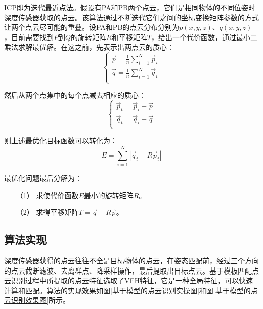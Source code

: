 \documentclass[fontset=fandol,type=bachelor,campus=harbin,bsmainpagenumberline=true]{hithesisbook}
\begin{document}
ICP即为迭代最近点法。假设有PA和PB两个点云，它们是相同物体的不同位姿时深度传感器获取的点云。该算法通过不断迭代它们之间的坐标变换矩阵参数的方式让两个点云尽可能的重叠\cite{chetverikov2002trimmed}。设PA和PB的点云分布分别为$p\left( x,y,z \right) $、$q\left( x,y,z \right) $，目前需要找到$P$到$Q$的旋转矩阵$R$和平移矩阵$T$，给出一个代价函数，通过最小二乘法求解最优解。在这之前，先表示出两点云的质心：
\begin{equation}
\left\{ \begin{array}{c}
	\vec{p}=\frac{1}{n}\sum_{i=1}^N{\vec{p}_i}\\
	\vec{q}=\frac{1}{n}\sum_{i=1}^N{\vec{q}_i}\\
\end{array} \right. 
\label{点云质心描述1} 
\end{equation}


然后从两个点集中的每个点减去相应的质心：
\begin{equation}
\left\{ \begin{array}{c}
	\vec{p}_t=\vec{p}_i-\vec{p}\\
	\vec{q}_t=\vec{q}_i-\vec{q}\\
\end{array} \right. 
\label{点云质心描述2} 
\end{equation}


则上述最优化目标函数可以转化为：
\begin{equation}
E=\sum_{i=1}^N{\left| \vec{q}_t-R\vec{p}_t \right|}
\label{ICP代价函数} 
\end{equation}


最优化问题最后分解为：
\begin{itemize}
\item[（1）]
求使代价函数$E$最小的旋转矩阵$R$。
\item[（2）]
求得平移矩阵$T=\vec{q}-R\vec{p}$。
\end{itemize}

\subsection{算法实现}
深度传感器获得的点云往往不全是目标物体的点云，在姿态匹配前，经过三个方向的点云截断滤波、去离群点、降采样操作，最后提取出目标点云。基于模板匹配点云识别过程中所提取的点云特征选取了VFH特征，它是一种全局特征，可以快速计算和匹配。算法的实现效果如图\ref{基于模型的点云识别实操图}和图\ref{基于模型的点云识别效果图}所示。
\end{document}
